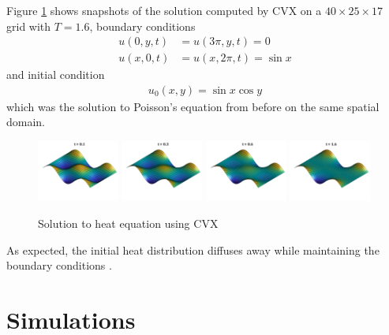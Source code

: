 \documentclass[conference]{IEEEtran}
\begin{document}
Figure \ref{fig:heat-solution} shows snapshots of the solution computed by CVX on a $40 \times 25 \times 17$ grid with $T = 1.6$, boundary conditions
\begin{align}
  u(0, y, t) &= u(3\pi, y, t) = 0 \\
  u(x, 0, t) &= u(x, 2\pi, t) = \sin x
\end{align}
and initial condition
\begin{align}
  u_0(x, y) = \sin x \cos y
\end{align}
which was the solution to Poisson's equation from before on the same spatial domain.
\begin{figure}[b]
  \begin{center}
    \includegraphics[width=0.24\textwidth,trim={1cm 1cm 0 0},clip]{heat-solution-1}
    \includegraphics[width=0.24\textwidth,trim={1cm 1cm 0 0},clip]{heat-solution-3}
    \includegraphics[width=0.24\textwidth,trim={1cm 1cm 0 0},clip]{heat-solution-6}
    \includegraphics[width=0.24\textwidth,trim={1cm 1cm 0 0},clip]{heat-solution-16}
    \caption{Solution to heat equation using CVX}
    \label{fig:heat-solution}
  \end{center}
\end{figure}
As expected, the initial heat distribution diffuses away while maintaining the boundary conditions .


\section{Simulations}
\end{document}
